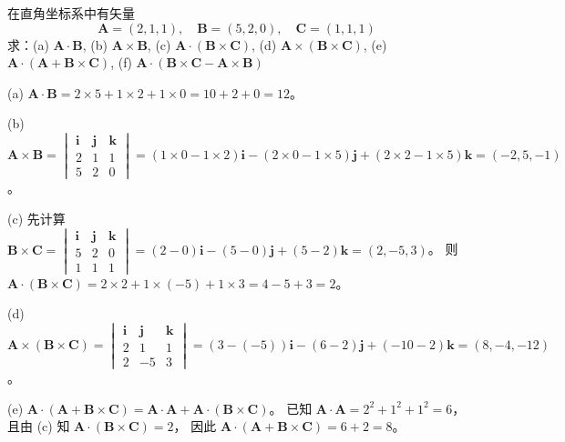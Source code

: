 \begin{exercise}\label{ex:1.22}
在直角坐标系中有矢量
$$ \boldsymbol{A} = (2, 1, 1), \quad \boldsymbol{B} = (5, 2, 0), \quad \boldsymbol{C} = (1, 1, 1) $$
求：(a) $\boldsymbol{A} \cdot \boldsymbol{B}$, (b) $\boldsymbol{A} \times \boldsymbol{B}$, (c) $\boldsymbol{A} \cdot (\boldsymbol{B} \times \boldsymbol{C})$,
(d) $\boldsymbol{A} \times (\boldsymbol{B} \times \boldsymbol{C})$, (e) $\boldsymbol{A} \cdot (\boldsymbol{A} + \boldsymbol{B} \times \boldsymbol{C})$, (f) $\boldsymbol{A} \cdot (\boldsymbol{B} \times \boldsymbol{C} - \boldsymbol{A} \times \boldsymbol{B})$
\end{exercise}
\begin{solution}
(a) $\boldsymbol{A} \cdot \boldsymbol{B} = 2 \times 5 + 1 \times 2 + 1 \times 0 = 10 + 2 + 0 = 12$。

(b) $\boldsymbol{A} \times \boldsymbol{B} = \begin{vmatrix} \boldsymbol{i} & \boldsymbol{j} & \boldsymbol{k} \\ 2 & 1 & 1 \\ 5 & 2 & 0 \end{vmatrix} = (1 \times 0 - 1 \times 2)\boldsymbol{i} - (2 \times 0 - 1 \times 5)\boldsymbol{j} + (2 \times 2 - 1 \times 5)\boldsymbol{k} = (-2, 5, -1)$。

(c) 先计算 $\boldsymbol{B} \times \boldsymbol{C} = \begin{vmatrix} \boldsymbol{i} & \boldsymbol{j} & \boldsymbol{k} \\ 5 & 2 & 0 \\ 1 & 1 & 1 \end{vmatrix} = (2-0)\boldsymbol{i} - (5-0)\boldsymbol{j} + (5-2)\boldsymbol{k} = (2, -5, 3)$。
则 $\boldsymbol{A} \cdot (\boldsymbol{B} \times \boldsymbol{C}) = 2 \times 2 + 1 \times (-5) + 1 \times 3 = 4 - 5 + 3 = 2$。

(d) $\boldsymbol{A} \times (\boldsymbol{B} \times \boldsymbol{C}) = \begin{vmatrix} \boldsymbol{i} & \boldsymbol{j} & \boldsymbol{k} \\ 2 & 1 & 1 \\ 2 & -5 & 3 \end{vmatrix} = (3 - (-5))\boldsymbol{i} - (6 - 2)\boldsymbol{j} + (-10 - 2)\boldsymbol{k} = (8, -4, -12)$。

(e) $\boldsymbol{A} \cdot (\boldsymbol{A} + \boldsymbol{B} \times \boldsymbol{C}) = \boldsymbol{A} \cdot \boldsymbol{A} + \boldsymbol{A} \cdot (\boldsymbol{B} \times \boldsymbol{C})$。
已知 $\boldsymbol{A} \cdot \boldsymbol{A} = 2^2 + 1^2 + 1^2 = 6$，且由 (c) 知 $\boldsymbol{A} \cdot (\boldsymbol{B} \times \boldsymbol{C}) = 2$，
因此 $\boldsymbol{A} \cdot (\boldsymbol{A} + \boldsymbol{B} \times \boldsymbol{C}) = 6 + 2 = 8$。


\end{solution}
